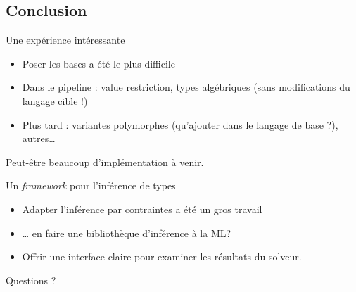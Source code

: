 \documentclass[final]{beamer}
\begin{document}
\subsection{Conclusion}

\begin{frame}{Une expérience intéressante}
  \begin{itemize}
    \item Poser les bases a été le plus difficile
    \item Dans le pipeline : value restriction, types algébriques (sans
      modifications du langage cible !)
    \item Plus tard : variantes polymorphes (qu'ajouter dans le langage de
      base ?), autres…
  \end{itemize}

  Peut-être beaucoup d'implémentation à venir.
\end{frame}

\begin{frame}{Un \emph{framework} pour l'inférence de types}
  \begin{itemize}
    \item Adapter l'inférence par contraintes a été un gros travail
    \item … en faire une bibliothèque d'inférence à la ML?
    \item Offrir une interface claire pour examiner les résultats du solveur. 
  \end{itemize}
\end{frame}


\begin{frame}
  \begin{center}
    \Huge
    Questions ?
  \end{center}
\end{frame}
\end{document}
